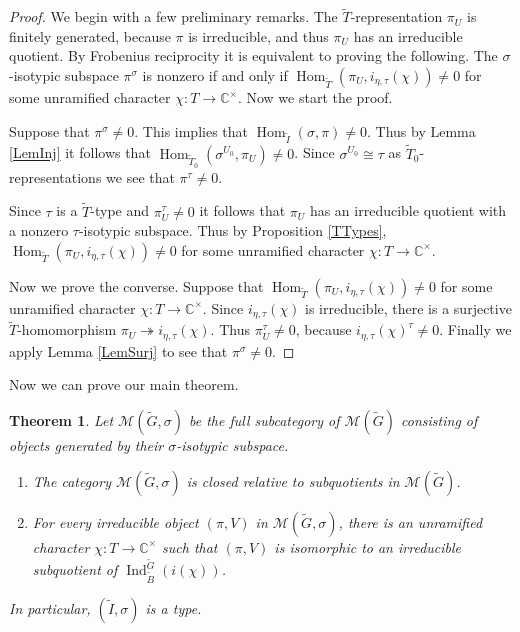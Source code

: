 \documentclass[10pt, letterpaper]{amsart}
\theoremstyle{plain}
\newtheorem{Thm}[equation]{Theorem}
\theoremstyle{definition}
\numberwithin{equation}{section}
\newcommand{\Gt}{\widetilde{G}}
\newcommand{\It}{\widetilde{I}}
\newcommand{\Tt}{\widetilde{T}}
\newcommand{\Ind}{\operatorname{Ind}}
\newcommand{\Hom}{\operatorname{Hom}}
\begin{document}
\begin{proof}
    We begin with a few preliminary remarks. The $\Tt$-representation $\pi_{U}$ is finitely generated, because $\pi$ is irreducible, and thus $\pi_{U}$ has an irreducible quotient. By Frobenius reciprocity it is equivalent to proving the following. The $\sigma$-isotypic subspace $\pi^{\sigma}$ is nonzero if and only if $\Hom_{\Tt}(\pi_{U},i_{\eta,\tau}(\chi))\neq 0$ for some unramified character $\chi:T\rightarrow \mathbb{C}^{\times}$. Now we start the proof.
    
    Suppose that $\pi^{\sigma}\neq 0$. This implies that $\Hom_{\It}(\sigma,\pi)\neq 0$. Thus by Lemma \ref{LemInj} it follows that $\Hom_{\Tt_{0}}(\sigma^{U_{0}},\pi_{U})\neq 0$. Since $\sigma^{U_{0}}\cong\tau$ as $\Tt_{0}$-representations we see that $\pi^{\tau}\neq0$. 

    Since $\tau$ is a $\Tt$-type and $\pi_{U}^{\tau}\neq 0$ it follows that $\pi_{U}$ has an irreducible quotient with a nonzero $\tau$-isotypic subspace. Thus by Proposition \ref{TTypes}, $\Hom_{\Tt}(\pi_{U},i_{\eta,\tau}(\chi))\neq 0$ for some unramified character $\chi:T\rightarrow \mathbb{C}^{\times}$.
    
    Now we prove the converse. Suppose that $\Hom_{\Tt}(\pi_{U},i_{\eta,\tau}(\chi))\neq 0$ for some unramified character $\chi:T\rightarrow \mathbb{C}^{\times}$. Since $i_{\eta,\tau}(\chi)$ is irreducible, there is a surjective $\Tt$-homomorphism $\pi_{U}\twoheadrightarrow i_{\eta,\tau}(\chi)$. Thus $\pi_{U}^{\tau}\neq 0$, because $i_{\eta,\tau}(\chi)^{\tau}\neq 0$. Finally we apply Lemma \ref{LemSurj} to see that $\pi^{\sigma}\neq0$.
\end{proof}

Now we can prove our main theorem. 


\begin{Thm}\label{TypesThm}\label{IType}
Let $\mathcal{M}(\Gt,\sigma)$ be the full subcategory of $\mathcal{M}(\Gt)$ consisting of objects generated by their $\sigma$-isotypic subspace.
	\begin{enumerate}
		\item The category $\mathcal{M}(\Gt,\sigma)$ is closed relative to subquotients in $\mathcal{M}(\Gt)$.\label{SubQuot}
		\item For every irreducible object $(\pi,V)$ in $\mathcal{M}(\Gt,\sigma)$, there is an unramified character $\chi:T\rightarrow \mathbb{C}^{\times}$ such that $(\pi,V)$ is isomorphic to an irreducible subquotient of $\Ind_{\widetilde{B}}^{\Gt}(i(\chi))$.\label{BernComp}
	\end{enumerate}
In particular, $(\It, \sigma)$ is a type.
\end{Thm}
\end{document}
